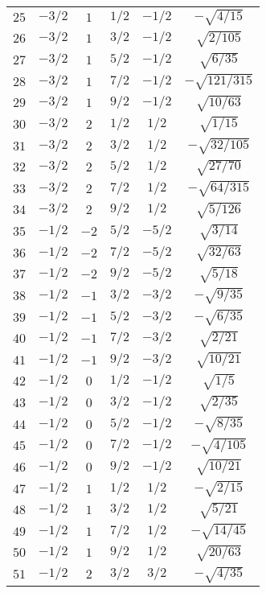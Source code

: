 \begin{table}
\begin{center}
\begin{tabular}{|c|c|c|c|c|c|}
$25$ & $-3/2$ & $1$ & $1/2$ & $-1/2$ & $-\sqrt{4/15}$ \\ 
$26$ & $-3/2$ & $1$ & $3/2$ & $-1/2$ & $\sqrt{2/105}$ \\ 
$27$ & $-3/2$ & $1$ & $5/2$ & $-1/2$ & $\sqrt{6/35}$ \\ 
$28$ & $-3/2$ & $1$ & $7/2$ & $-1/2$ & $-\sqrt{121/315}$ \\ 
$29$ & $-3/2$ & $1$ & $9/2$ & $-1/2$ & $\sqrt{10/63}$ \\ 
$30$ & $-3/2$ & $2$ & $1/2$ & $1/2$ & $\sqrt{1/15}$ \\ 
$31$ & $-3/2$ & $2$ & $3/2$ & $1/2$ & $-\sqrt{32/105}$ \\ 
$32$ & $-3/2$ & $2$ & $5/2$ & $1/2$ & $\sqrt{27/70}$ \\ 
$33$ & $-3/2$ & $2$ & $7/2$ & $1/2$ & $-\sqrt{64/315}$ \\ 
$34$ & $-3/2$ & $2$ & $9/2$ & $1/2$ & $\sqrt{5/126}$ \\ 
$35$ & $-1/2$ & $-2$ & $5/2$ & $-5/2$ & $\sqrt{3/14}$ \\ 
$36$ & $-1/2$ & $-2$ & $7/2$ & $-5/2$ & $\sqrt{32/63}$ \\ 
$37$ & $-1/2$ & $-2$ & $9/2$ & $-5/2$ & $\sqrt{5/18}$ \\ 
$38$ & $-1/2$ & $-1$ & $3/2$ & $-3/2$ & $-\sqrt{9/35}$ \\ 
$39$ & $-1/2$ & $-1$ & $5/2$ & $-3/2$ & $-\sqrt{6/35}$ \\ 
$40$ & $-1/2$ & $-1$ & $7/2$ & $-3/2$ & $\sqrt{2/21}$ \\ 
$41$ & $-1/2$ & $-1$ & $9/2$ & $-3/2$ & $\sqrt{10/21}$ \\ 
$42$ & $-1/2$ & $0$ & $1/2$ & $-1/2$ & $\sqrt{1/5}$ \\ 
$43$ & $-1/2$ & $0$ & $3/2$ & $-1/2$ & $\sqrt{2/35}$ \\ 
$44$ & $-1/2$ & $0$ & $5/2$ & $-1/2$ & $-\sqrt{8/35}$ \\ 
$45$ & $-1/2$ & $0$ & $7/2$ & $-1/2$ & $-\sqrt{4/105}$ \\ 
$46$ & $-1/2$ & $0$ & $9/2$ & $-1/2$ & $\sqrt{10/21}$ \\ 
$47$ & $-1/2$ & $1$ & $1/2$ & $1/2$ & $-\sqrt{2/15}$ \\ 
$48$ & $-1/2$ & $1$ & $3/2$ & $1/2$ & $\sqrt{5/21}$ \\ 
$49$ & $-1/2$ & $1$ & $7/2$ & $1/2$ & $-\sqrt{14/45}$ \\ 
$50$ & $-1/2$ & $1$ & $9/2$ & $1/2$ & $\sqrt{20/63}$ \\ 
$51$ & $-1/2$ & $2$ & $3/2$ & $3/2$ & $-\sqrt{4/35}$ \\ 

\end{tabular}
\end{center}
\end{table}
